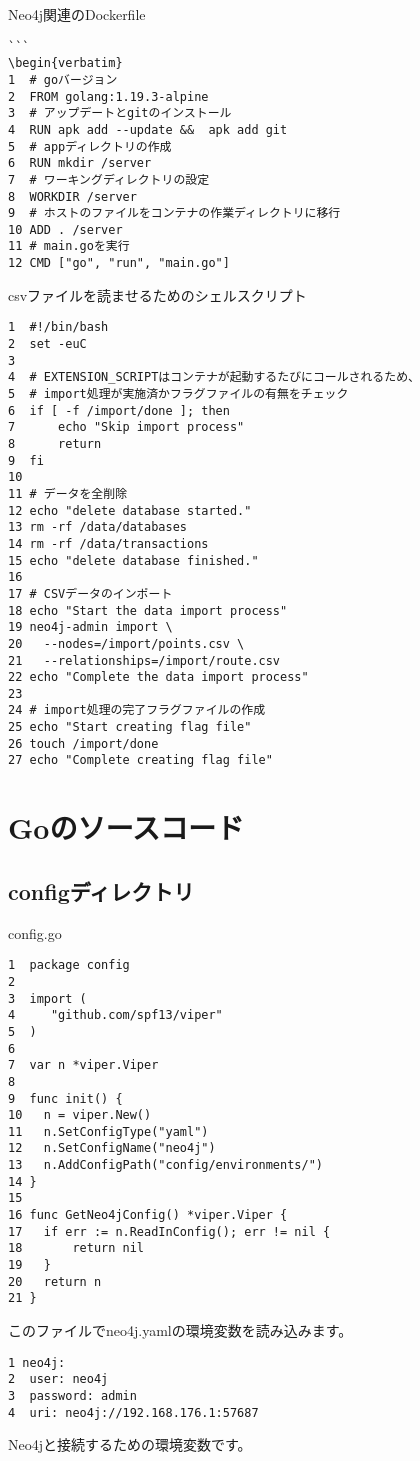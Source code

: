 Neo4j関連のDockerfile
\begin{tcolorbox}[title=dockerfile]
  \begin{verbatim}
```
\begin{verbatim}
1  # goバージョン
2  FROM golang:1.19.3-alpine
3  # アップデートとgitのインストール
4  RUN apk add --update &&  apk add git
5  # appディレクトリの作成
6  RUN mkdir /server
7  # ワーキングディレクトリの設定
8  WORKDIR /server
9  # ホストのファイルをコンテナの作業ディレクトリに移行
10 ADD . /server
11 # main.goを実行
12 CMD ["go", "run", "main.go"]
\end{verbatim}
\end{tcolorbox}

csvファイルを読ませるためのシェルスクリプト
\begin{tcolorbox}[breakable]
\begin{verbatim}
1  #!/bin/bash
2  set -euC
3
4  # EXTENSION_SCRIPTはコンテナが起動するたびにコールされるため、
5  # import処理が実施済かフラグファイルの有無をチェック
6  if [ -f /import/done ]; then
7      echo "Skip import process"
8      return
9  fi
10
11 # データを全削除
12 echo "delete database started."
13 rm -rf /data/databases
14 rm -rf /data/transactions
15 echo "delete database finished."
16
17 # CSVデータのインポート
18 echo "Start the data import process"
19 neo4j-admin import \
20   --nodes=/import/points.csv \
21   --relationships=/import/route.csv
22 echo "Complete the data import process"
23
24 # import処理の完了フラグファイルの作成
25 echo "Start creating flag file"
26 touch /import/done
27 echo "Complete creating flag file"
\end{verbatim}
\end{tcolorbox}
    
\section{Goのソースコード}
\subsection{configディレクトリ}
config.go
\begin{tcolorbox}[breakable]
\begin{verbatim}
1  package config
2
3  import (
4  	  "github.com/spf13/viper"
5  )
6
7  var n *viper.Viper
8
9  func init() {
10 	 n = viper.New()
11	 n.SetConfigType("yaml")
12 	 n.SetConfigName("neo4j")
13 	 n.AddConfigPath("config/environments/")
14 }
15
16 func GetNeo4jConfig() *viper.Viper {
17	 if err := n.ReadInConfig(); err != nil {
18		 return nil
19	 }
20	 return n
21 }
\end{verbatim}
\end{tcolorbox}
このファイルでneo4j.yamlの環境変数を読み込みます。
\begin{tcolorbox}[breakable]
\begin{verbatim}
1 neo4j:
2  user: neo4j
3  password: admin
4  uri: neo4j://192.168.176.1:57687
\end{verbatim}
\end{tcolorbox}
Neo4jと接続するための環境変数です。
